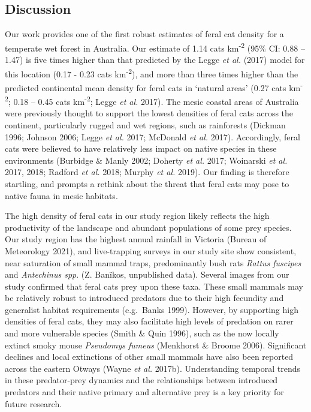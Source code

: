 \documentclass[11pt,a4paper,titlepage,twoside,openright]{style/unimelbthesis}
\begin{document}
\begin{mainmatter}
{\section{Discussion}\label{discussion}}

Our work provides one of the first robust estimates of feral cat density for a temperate wet forest in Australia. Our estimate of 1.14 cats km\textsuperscript{-2} (95\% CI: 0.88 -- 1.47) is five times higher than that predicted by the Legge \emph{et al.} (2017) model for this location (0.17 - 0.23 cats km\textsuperscript{-2}), and more than three times higher than the predicted continental mean density for feral cats in `natural areas' (0.27 cats km\textsuperscript{-2}; 0.18 -- 0.45 cats km\textsuperscript{-2}; Legge \emph{et al.} 2017). The mesic coastal areas of Australia were previously thought to support the lowest densities of feral cats across the continent, particularly rugged and wet regions, such as rainforests (Dickman 1996; Johnson 2006; Legge \emph{et al.} 2017; McDonald \emph{et al.} 2017). Accordingly, feral cats were believed to have relatively less impact on native species in these environments (Burbidge \& Manly 2002; Doherty \emph{et al.} 2017; Woinarski \emph{et al.} 2017, 2018; Radford \emph{et al.} 2018; Murphy \emph{et al.} 2019). Our finding is therefore startling, and prompts a rethink about the threat that feral cats may pose to native fauna in mesic habitats.

The high density of feral cats in our study region likely reflects the high productivity of the landscape and abundant populations of some prey species. Our study region has the highest annual rainfall in Victoria (Bureau of Meteorology 2021), and live-trapping surveys in our study site show consistent, near saturation of small mammal traps, predominantly bush rats \emph{Rattus fuscipes} and \emph{Antechinus spp}. (Z. Banïkos, unpublished data). Several images from our study confirmed that feral cats prey upon these taxa. These small mammals may be relatively robust to introduced predators due to their high fecundity and generalist habitat requirements (e.g.~Banks 1999). However, by supporting high densities of feral cats, they may also facilitate high levels of predation on rarer and more vulnerable species (Smith \& Quin 1996), such as the now locally extinct smoky mouse \emph{Pseudomys fumeus} (Menkhorst \& Broome 2006). Significant declines and local extinctions of other small mammals have also been reported across the eastern Otways (Wayne \emph{et al.} 2017b). Understanding temporal trends in these predator-prey dynamics and the relationships between introduced predators and their native primary and alternative prey is a key priority for future research.


\end{mainmatter}
\end{document}
